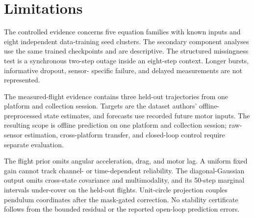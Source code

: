 \section{Limitations}

The controlled evidence concerns five equation families with known inputs and
eight independent data-training seed clusters. The secondary component analyses
use the same trained checkpoints and are descriptive. The structured
missingness test is a synchronous two-step
outage inside an eight-step context. Longer bursts, informative dropout, sensor-
specific failure, and delayed measurements are not represented.

The measured-flight evidence contains three held-out trajectories from one
platform and collection session. Targets are the dataset authors'
offline-preprocessed state estimates, and forecasts use recorded future motor
inputs. The resulting scope is offline prediction on one platform and
collection session; raw-sensor estimation, cross-platform transfer, and
closed-loop control require separate evaluation.

The flight prior omits angular acceleration, drag, and motor lag. A uniform
fixed gain cannot track channel- or time-dependent reliability. The
diagonal-Gaussian output omits cross-state covariance and multimodality, and its
50-step marginal intervals under-cover on the held-out flights. Unit-circle
projection couples pendulum coordinates after the mask-gated correction. No
stability certificate follows from the bounded residual or the reported
open-loop prediction errors.

